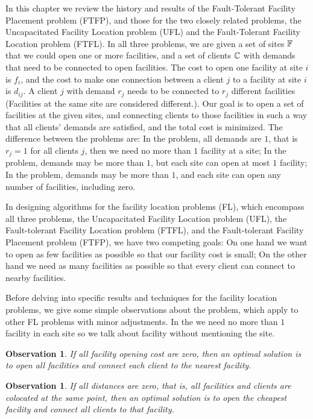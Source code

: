 \documentclass[oneside,final]{ucr}
\newtheorem{observation}[theorem]{Observation}
\begin{document}
In this chapter we review the history and results of the
Fault-Tolerant Facility Placement problem (FTFP), and those
for the two closely related problems, the Uncapacitated
Facility Location problem (UFL) and the Fault-Tolerant
Facility Location problem (FTFL). In all three problems, we
are given a set of sites $\mathbb{F}$ that we could open one
or more facilities, and a set of clients $\mathbb{C}$ with
demands that need to be connected to open facilities. The
cost to open one facility at site $i$ is $f_i$, and the cost
to make one connection between a client $j$ to a facility at
site $i$ is $d_{ij}$. A client $j$ with demand $r_j$ needs
to be connected to $r_j$ different facilities (Facilities at
the same site are considered different.). Our goal is to
open a set of facilities at the given sites, and connecting
clients to those facilities in such a way that all clients'
demands are satisfied, and the total cost is minimized. The
difference between the problems are: In the {\UFL} problem,
all demands are $1$, that is $r_j=1$ for all clients $j$,
then we need no more than $1$ facility at a site; In the
{\FTFL} problem, demands may be more than $1$, but each site
can open at most $1$ facility; In the {\FTFP} problem,
demands may be more than $1$, and each site can open any
number of facilities, including zero.

In designing algorithms for the facility location problems
(FL), which encompass all three problems, the Uncapacitated
Facility Location problem (UFL), the Fault-tolerant Facility
Location problem (FTFL), and the Fault-tolerant Facility
Placement problem (FTFP), we have two competing goals: On
one hand we want to open as few facilities as possible so
that our facility cost is small; On the other hand we need
as many facilities as possible so that every client can
connect to nearby facilities.

Before delving into specific results and techniques for the
facility location problems, we give some simple observations
about the {\UFL} problem, which apply to other FL problems
with minor adjustments. In the {\UFL} we need no more than
$1$ facility in each site so we talk about facility without
mentioning the site.
\begin{observation}
  If all facility opening cost are zero, then an optimal
  solution is to open all facilities and connect each client
  to the nearest facility.
\end{observation}

\begin{observation}
  If all distances are zero, that is, all facilities and
  clients are colocated at the same point, then an optimal
  solution is to open the cheapest facility and connect all
  clients to that facility.
\end{observation}
\end{document}
